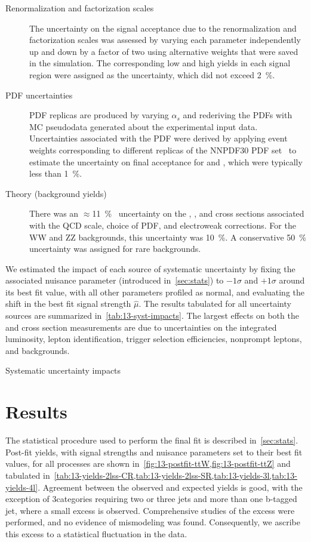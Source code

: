 \begin{description}
  \item[Renormalization and factorization scales] The uncertainty on the signal acceptance due to
    the renormalization and factorization scales was assessed by varying each parameter
    independently up and down by a factor of two using alternative weights that were saved in the
    simulation. The corresponding low and high yields in each signal region were assigned as the
    uncertainty, which did not exceed \SI{2}{\percent}.
  \item[PDF uncertainties] PDF replicas are produced by varying $\alpha_s$ and rederiving the PDFs
    with MC pseudodata generated about the experimental input data. Uncertainties associated with
    the PDF were derived by applying event weights corresponding to different replicas of the
    NNPDF30 PDF set~\cite{Ball:2014uwa} to estimate the uncertainty on final acceptance for \ttW and
    \ttZ, which were typically less than \SI{1}{\percent}.
  \item[Theory (background yields)] There was an $\approx$\SI{11}{\percent}~\cite{deFlorian:2016spz}
    uncertainty on the \ttH, \ttZ, and \ttW cross sections associated with the QCD scale, choice of
    PDF, and electroweak corrections. For the WW and ZZ backgrounds, this uncertainty was
    \SI{10}{\percent}. A conservative \SI{50}{\percent} uncertainty was assigned for rare
    backgrounds.
\end{description}
We estimated the impact of each source of systematic uncertainty by fixing the associated nuisance
parameter (introduced in~\cref{sec:stats}) to $-1\sigma$ and $+1\sigma$ around its best fit value,
with all other parameters profiled as normal, and evaluating the shift in the best fit signal
strength $\hat{\mu}$. The results tabulated for all uncertainty sources are summarized
in~\cref{tab:13-syst-impacts}. The largest effects on both the \ttW and \ttZ cross section
measurements are due to uncertainties on the integrated luminosity, lepton identification, trigger
selection efficiencies, nonprompt leptons, and \ttX backgrounds.

\begin{table}
  \caption{Systematic uncertainty impacts}
  \label{tab:13-syst-impacts}
  
\end{table}

\section{Results}
The statistical procedure used to perform the final fit is described in~\cref{sec:stats}. Post-fit
yields, with signal strengths and nuisance parameters set to their best fit values, for all
processes are shown in~\cref{fig:13-postfit-ttW,fig:13-postfit-ttZ} and tabulated
in~\cref{tab:13-yields-2lss-CR,tab:13-yields-2lss-SR,tab:13-yields-3l,tab:13-yields-4l}. Agreement
between the observed and expected yields is good, with the exception of 3\lep \ttZ categories
requiring two or three jets and more than one b-tagged jet, where a small excess is observed.
Comprehensive studies of the excess were performed, and no evidence of mismodeling was found.
Consequently, we ascribe this excess to a statistical fluctuation in the data.

